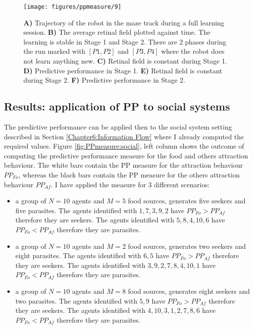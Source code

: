 \begin{figure}[!hbt]
	\begin{center}
		\texttt{[image: figures/ppmeasure/9]}
	\end{center}
	\caption[Full learning robot on the maze track]{
	{\bf A)} Trajectory of the robot in the maze track during a full learning session.
	{\bf B)} The average retinal field plotted against time. The learning is stable in Stage 1 and Stage 2.
There are 2 phases during the run marked with $[P1,P2]$ and $[P3,P4]$ where the robot does not learn
anything new.
	{\bf C)} Retinal field is constant during Stage 1.
	{\bf D)} Predictive performance in Stage 1. 
	{\bf E)} Retinal field is constant during Stage 2.
	{\bf F)} Predictive performance in Stage 2. 
	\label{PPmeasure:MazeFinalLearning}
	}
\end{figure}

\subsection{Results: application of PP to social systems \label{Chapter8:PPsocial}}

The predictive performance can be applied then to the social system
setting described in Section \ref{Chapter6:Information Flow} where
I already computed the required values.
Figure \ref{fig:PPmeasure:social}, left column shows the outcome of computing the predictive
performance measure for the food and others attraction behaviour.
The white bars contain the PP measure for the attraction behaviour $PP_{Fo}$, whereas
the black bars contain the PP measure for the others attraction behaviour $PP_{Af}$.
I have applied the measure for 3 different scenarios:
\begin{itemize}
 \item a group of $N=10$ agents and $M=5$ food sources, generates five seekers and five parasites.
The agents identified with $1,7,3,9,2$ have $PP_{Fo}> PP_{Af}$ therefore they are
seekers.
The agents identified with $5,8,4,10,6$ have $PP_{Fo}< PP_{Af}$ therefore they are
parasites.
 \item a group of $N=10$ agents and $M=2$ food sources, generates two seekers and eight parasites.
The agents identified with $6,5$ have $PP_{Fo}> PP_{Af}$ therefore they are
seekers.
The agents identified with $3,9,2,7,8,4,10,1$ have $PP_{Fo}< PP_{Af}$ therefore they are
parasites.
 \item a group of $N=10$ agents and $M=8$ food sources, generates eight seekers and two parasites.
The agents identified with $5,9$ have $PP_{Fo}> PP_{Af}$ therefore they are
seekers.
The agents identified with $4,10,3,1,2,7,8,6$ have $PP_{Fo}< PP_{Af}$ therefore they are
parasites.
\end{itemize}

